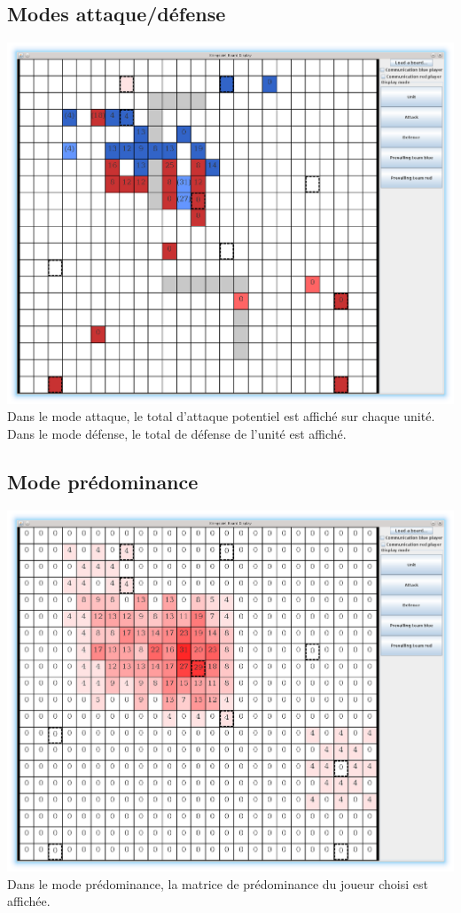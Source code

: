 		\subsection{Modes attaque/défense}
			\includegraphics[scale=0.4]{images/screen2.eps}
			Dans le mode attaque, le total d'attaque potentiel est affiché sur chaque unité.
			Dans le mode défense, le total de défense de l'unité est affiché.
		
			\clearpage	

		\subsection{Mode prédominance}
			\includegraphics[scale=0.4]{images/screen3.eps}
			Dans le mode prédominance, la matrice de prédominance du joueur choisi est affichée.

